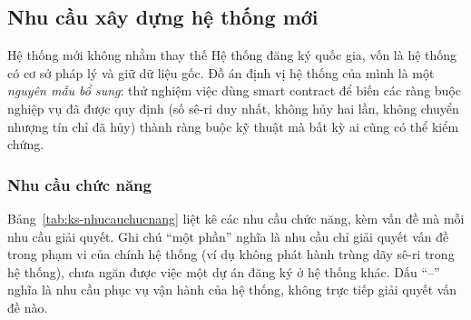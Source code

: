 \FloatBarrier
\subsection*{Nhu cầu xây dựng hệ thống mới}
\label{subsec:ks-nhucau}

Hệ thống mới không nhằm thay thế Hệ thống đăng ký quốc gia, vốn là hệ thống có cơ sở pháp lý và giữ dữ liệu gốc. Đồ án định vị hệ thống của mình là một \emph{nguyên mẫu bổ sung}: thử nghiệm việc dùng smart contract để biến các ràng buộc nghiệp vụ đã được quy định (số sê-ri duy nhất, không hủy hai lần, không chuyển nhượng tín chỉ đã hủy) thành ràng buộc kỹ thuật mà bất kỳ ai cũng có thể kiểm chứng.

\subsubsection*{Nhu cầu chức năng}

Bảng~\ref{tab:ks-nhucauchucnang} liệt kê các nhu cầu chức năng, kèm vấn đề mà mỗi nhu cầu giải quyết. Ghi chú ``một phần'' nghĩa là nhu cầu chỉ giải quyết vấn đề trong phạm vi của chính hệ thống (ví dụ không phát hành trùng dãy sê-ri trong hệ thống), chưa ngăn được việc một dự án đăng ký ở hệ thống khác. Dấu ``--'' nghĩa là nhu cầu phục vụ vận hành của hệ thống, không trực tiếp giải quyết vấn đề nào.

